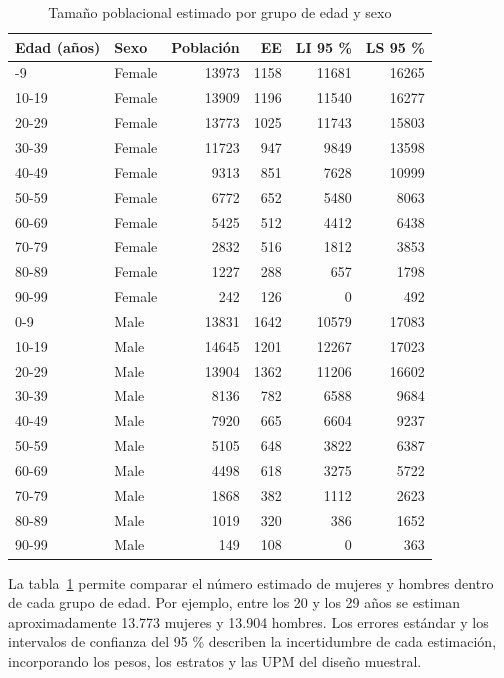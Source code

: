 \documentclass[
  spanish,
  11pt,
  letterpaper,
  oneside,
  open=any]{scrbook}
\begin{document}
{

\begin{longtable}[]{@{}llrrrr@{}}

\caption{\label{tbl-tamano-edad-sexo}Tamaño poblacional estimado por
grupo de edad y sexo}

\tabularnewline

\toprule\noalign{}
Edad (años) & Sexo & Población & EE & LI 95 \% & LS 95 \% \\
\midrule\noalign{}
\endhead
\bottomrule\noalign{}
\endlastfoot
0-9 & Female & 13973 & 1158 & 11681 & 16265 \\
10-19 & Female & 13909 & 1196 & 11540 & 16277 \\
20-29 & Female & 13773 & 1025 & 11743 & 15803 \\
30-39 & Female & 11723 & 947 & 9849 & 13598 \\
40-49 & Female & 9313 & 851 & 7628 & 10999 \\
50-59 & Female & 6772 & 652 & 5480 & 8063 \\
60-69 & Female & 5425 & 512 & 4412 & 6438 \\
70-79 & Female & 2832 & 516 & 1812 & 3853 \\
80-89 & Female & 1227 & 288 & 657 & 1798 \\
90-99 & Female & 242 & 126 & 0 & 492 \\
0-9 & Male & 13831 & 1642 & 10579 & 17083 \\
10-19 & Male & 14645 & 1201 & 12267 & 17023 \\
20-29 & Male & 13904 & 1362 & 11206 & 16602 \\
30-39 & Male & 8136 & 782 & 6588 & 9684 \\
40-49 & Male & 7920 & 665 & 6604 & 9237 \\
50-59 & Male & 5105 & 648 & 3822 & 6387 \\
60-69 & Male & 4498 & 618 & 3275 & 5722 \\
70-79 & Male & 1868 & 382 & 1112 & 2623 \\
80-89 & Male & 1019 & 320 & 386 & 1652 \\
90-99 & Male & 149 & 108 & 0 & 363 \\

\end{longtable}

}

La tabla~\ref{tbl-tamano-edad-sexo} permite comparar el número estimado
de mujeres y hombres dentro de cada grupo de edad. Por ejemplo, entre
los 20 y los 29 años se estiman aproximadamente 13.773 mujeres y 13.904
hombres. Los errores estándar y los intervalos de confianza del 95 \%
describen la incertidumbre de cada estimación, incorporando los pesos,
los estratos y las UPM del diseño muestral.
\end{document}
